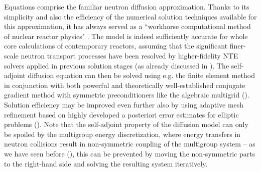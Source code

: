 Equations  comprise the familiar neutron diffusion approximation. 
Thanks to its simplicity and also the efficiency of the numerical solution techniques available for this approximation,
it has always served as a ``workhorse computational method of nuclear reactor physics" \cite[p. 43]{Stacey1}. The model is indeed sufficiently accurate for whole core calculations of contemporary reactors, assuming that the significant finer-scale neutron transport processes have been 
resolved by higher-fidelity NTE solvers applied in previous solution stages (as already discussed in ).
The self-adjoint diffusion equation can then be solved using e.g. the finite element method in conjunction with both
powerful and theoretically well-established conjugate gradient method with symmetric preconditioners like the
algebraic multigrid (\cite{vanek1,vanek2}). Solution efficiency may be improved even further also by using adaptive mesh
refinement based on highly developed a posteriori error estimates for elliptic problems (\cite{gratsch,Solin1,
demkowicz}).
Note that the self-adjoint property of the diffusion model can only be spoiled by the multigroup energy discretization, where energy 
transfers in neutron collisions result in non-symmetric coupling of the multigroup system -- as we have seen before 
(), this can be prevented by moving the non-symmetric parts to the right-hand side and solving the 
resulting system iteratively.

